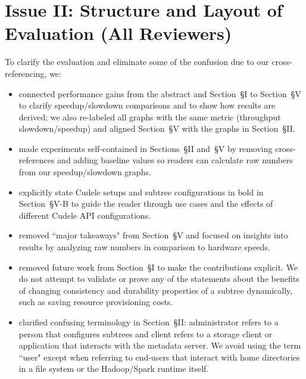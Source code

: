 \documentclass[onecolumn,conference]{IEEEtran}
\begin{document}
\section*{Issue II: Structure and Layout of Evaluation (All Reviewers)}

To clarify the evaluation and eliminate some of the confusion due to our
cross-referencing, we:

\begin{itemize}

  \item connected performance gains from the abstract and Section~{\S}I to
Section~{\S}V to clarify speedup/slowdown comparisons and to show how results
are derived; we also re-labeled all graphs with the same metric (throughput
slowdown/speedup) and aligned Section~{\S}V with the graphs in Section~{\S}II.

  \item made experiments self-contained in Sections~{\S}II and~{\S}V by
removing cross-references and adding baseline values so readers can calculate
raw numbers from our speedup/slowdown graphs. 

  \item explicitly state Cudele setups and subtree configurations in bold in
Section~{\S}V-B to guide the reader through use cases and the effects of
different Cudele API configurations.

  \item removed ``major takeaways" from Section~{\S}V and focused on
insights into results by analyzing raw numbers in comparison to hardware
speeds.

  \item removed future work from Section~{\S}I to make the contributions
explicit. We do not attempt to validate or prove any of the statements about
the benefits of changing consistency and durability properties of a subtree
dynamically, such as saving resource provisioning costs.  

  \item clarified confusing terminology in Section~{\S}II: administrator refers
to a person that configures subtrees and client refers to a storage client or
application that interacts with the metadata server. We avoid using the term
``user" except when referring to end-users that interact with home directories
in a file system or the Hadoop/Spark runtime itself.

\end{itemize}
\end{document}
